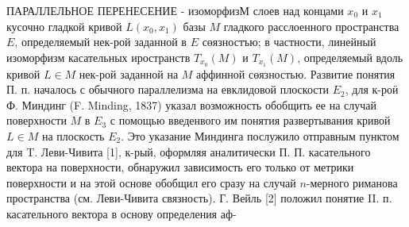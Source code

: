 \documentclass[10pt]{article}
\begin{document}
ПАРАЛЛЕЛЬНОЕ ПЕРЕНЕСЕНИЕ - изоморфизМ слоев над концами $x_{0}$ и $x_{1}$ кусочно гладкой кривой $L\left(x_{0}, x_{1}\right)$ базы $M$ гладкого расслоенного пространства $E$, определяемый нек-рой заданной в $E$ сөязностъю; в частности, линейный изоморфизм касательных иространств $T_{x_{0}}(M)$ и $T_{x_{1}}(M)$, определяемый вдоль кривой $L \in M$ нек-рой заданной на $M$ аффинной сөязностью. Развитие понятия П. п. началось с обычного параллелизма на евклидовой плоскости $E_{2}$, для к-роӥ Ф. Миндинг (F. Minding, 1837) указал возможность обобщить ее на случай поверхности $M$ в $E_{3}$ с помощью введенвого им понятия развертывания кривой $L \in M$ на плоскость $E_{2}$. Это указание Миндинга послужило отправным пунктом для T. Леви-Чивита [1], к-рый, оформляя аналитически П. П. касательного вектора на поверхности, обнаружил зависимость его только от метрики поверхности и на этой основе обобщил его сразу на случай $n$-мерного риманова пространства (см. Леви-Чивита связность). Г. Вейль [2] положил понятие II. п. касательного вектора в основу определения аф-
\end{document}
